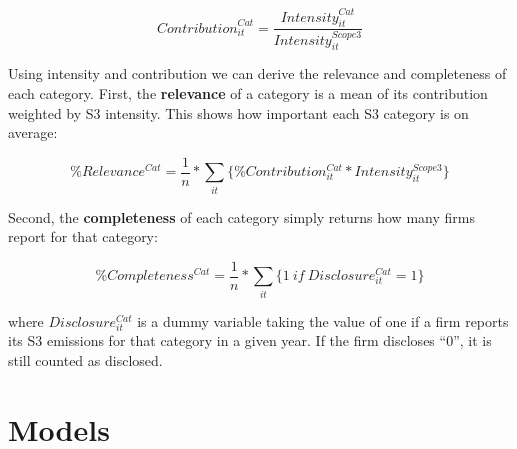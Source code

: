 \documentclass[12pt,twoside]{report}
\begin{document}
\begin{equation}
    \mathit{Contribution}_{it}^{Cat} = \frac{\mathit{Intensity}_{it}^{Cat}}{\mathit{Intensity}_{it}^{Scope3}}
\end{equation}

Using intensity and contribution we can derive the relevance and completeness of each category. First, the \textbf{relevance} of a category is a mean of its contribution weighted by S3 intensity. This shows how important each S3 category is on average:

\begin{equation}
    \mathit{\%Relevance^{Cat}} = \frac{1}{n}*\sum_{it}{\{\mathit{\%Contribution_{it}^{Cat}}*\mathit{Intensity_{it}^{Scope3}}\}}
\end{equation}

Second, the \textbf{completeness} of each category simply returns how many firms report for that category: 

\begin{equation}
    \mathit{\%Completeness^{Cat}} = \frac{1}{n}*\sum_{it}{\{1 \  \mathit{if \  Disclosure_{it}^{Cat}}=1\}}
\end{equation}

where $\mathit{Disclosure_{it}^{Cat}}$ is a dummy variable taking the value of one if a firm reports its S3 emissions for that category in a given year. If the firm discloses ``0'', it is still counted as disclosed.

\chapter{Models}
\end{document}
